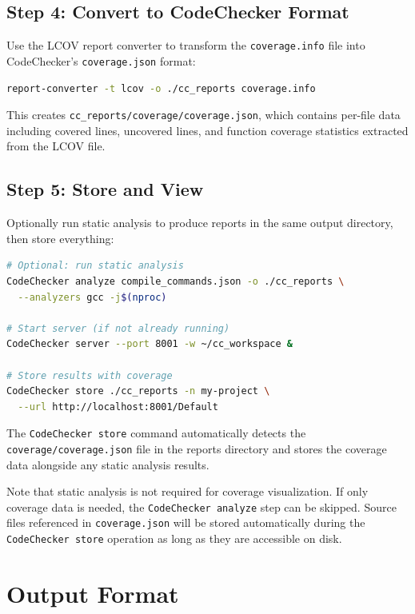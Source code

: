 \subsection{Step 4: Convert to CodeChecker Format}

Use the LCOV report converter to transform the \texttt{coverage.info} file into CodeChecker's \texttt{coverage.json} format:

\begin{lstlisting}[language=bash, caption={Converting LCOV data to CodeChecker format}]
report-converter -t lcov -o ./cc_reports coverage.info
\end{lstlisting}

This creates \texttt{cc\_reports/coverage/coverage.json}, which contains per-file data including covered lines, uncovered lines, and function coverage statistics extracted from the LCOV file.

\subsection{Step 5: Store and View}

Optionally run static analysis to produce reports in the same output directory, then store everything:

\begin{lstlisting}[language=bash, caption={Analyzing and storing results}]
# Optional: run static analysis
CodeChecker analyze compile_commands.json -o ./cc_reports \
  --analyzers gcc -j$(nproc)

# Start server (if not already running)
CodeChecker server --port 8001 -w ~/cc_workspace &

# Store results with coverage
CodeChecker store ./cc_reports -n my-project \
  --url http://localhost:8001/Default
\end{lstlisting}

The \texttt{CodeChecker store} command automatically detects the \texttt{coverage/coverage.json} file in the reports directory and stores the coverage data alongside any static analysis results.

Note that static analysis is not required for coverage visualization. If only coverage data is needed, the \texttt{CodeChecker analyze} step can be skipped. Source files referenced in \texttt{coverage.json} will be stored automatically during the \texttt{CodeChecker store} operation as long as they are accessible on disk.

\section{Output Format}

